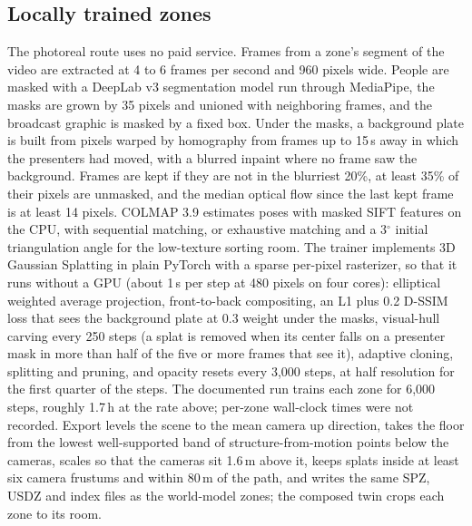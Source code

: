 \documentclass{article}
\begin{document}
\subsection{Locally trained zones}
The photoreal route uses no paid service. Frames from a zone's segment of the
video are extracted at 4 to 6 frames per second and 960 pixels wide. People are
masked with a DeepLab v3 segmentation model run through MediaPipe, the masks
are grown by 35 pixels and unioned with neighboring frames, and the broadcast
graphic is masked by a fixed box. Under the masks, a background plate is built
from pixels warped by homography from frames up to 15\,s away in which the
presenters had moved, with a blurred inpaint where no frame saw the
background. Frames are kept if they are not in the
blurriest 20\%, at least 35\% of their pixels are unmasked, and the median
optical flow since the last kept frame is at least 14 pixels. COLMAP 3.9
estimates poses with masked SIFT features on the CPU, with sequential matching,
or exhaustive matching and a 3$^\circ$ initial triangulation angle for the
low-texture sorting room. The trainer implements
3D Gaussian Splatting \cite{kerbl20233d} in plain PyTorch with a sparse
per-pixel rasterizer, so that it runs without a GPU (about 1\,s per step at
480 pixels on four cores): elliptical weighted average projection, front-to-back
compositing, an L1 plus 0.2 D-SSIM loss that sees the background plate at 0.3
weight under the masks, visual-hull carving every 250 steps (a splat is removed
when its center falls on a presenter mask in more than half of the five or
more frames that see it), adaptive cloning, splitting and pruning, and opacity
resets every 3{,}000 steps, at half resolution for the first quarter of the
steps. The documented run trains each zone for 6{,}000 steps, roughly 1.7\,h
at the rate above; per-zone wall-clock times were not recorded. Export levels
the scene to the mean camera up direction, takes the floor from the lowest
well-supported band of structure-from-motion points below the cameras, scales
so that the cameras sit 1.6\,m above it, keeps splats inside at least six
camera frustums and within 80\,m of the path, and writes the same SPZ, USDZ
and index files as the world-model zones; the composed twin crops each zone to
its room.
\end{document}

